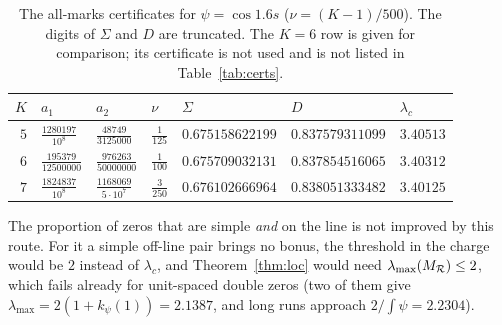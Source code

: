 \begin{table}[ht]\centering\small
\caption{The all-marks certificates for $\psi=\cos1.6s$ ($\nu=(K-1)/500$). The digits of $\Sigma$ and $D$ are truncated. The $K=6$ row is
given for comparison; its certificate is not used and is not listed in Table~\ref{tab:certs}.}\label{tab:allmarks}
\begin{tabular}{@{}rllllll@{}}
\toprule
$K$ & $a_1$ & $a_2$ & $\nu$ & $\Sigma$ & $D$ & $\lambda_c$\\
\midrule
$5$ & $\frac{1280197}{10^8}$ & $\frac{48749}{3125000}$ & $\frac1{125}$ & $0.675158622199$ & $0.837579311099$ & $3.40513$\\[2pt]
$6$ & $\frac{195379}{12500000}$ & $\frac{976263}{50000000}$ & $\frac1{100}$ & $0.675709032131$ & $0.837854516065$ & $3.40312$\\[2pt]
$7$ & $\frac{1824837}{10^8}$ & $\frac{1168069}{5\cdot10^7}$ & $\frac3{250}$ & $0.676102666964$ & $0.838051333482$ & $3.40125$\\
\bottomrule
\end{tabular}
\end{table}

\begin{remark}\label{rem:notS}
The proportion of zeros that are simple \emph{and} on the line is not improved by this route. For it a simple off-line pair brings no bonus, the
threshold in the charge would be $2$ instead of $\lambda_c$, and Theorem~\ref{thm:loc} would need $\lambda_{\max}(M_\mathcal R)\le2$, which fails already
for unit-spaced double zeros (two of them give $\lambda_{\max}=2(1+k_\psi(1))=2.1387$, and long runs approach $2/\!\int\psi=2.2304$).
\end{remark}
